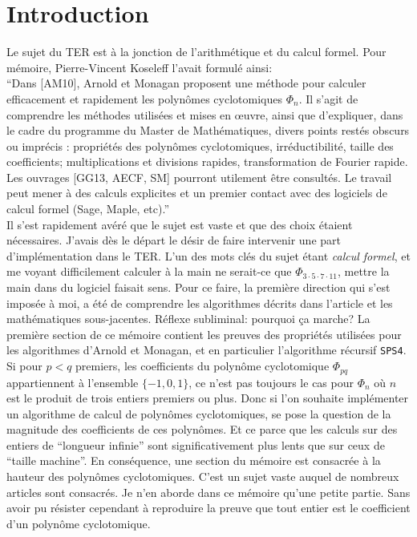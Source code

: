 \documentclass{article}
\newcounter{question}
\theoremstyle{break}                  %
\begin{document}
\section*{Introduction}
Le sujet du TER est à la jonction de l'arithmétique et du calcul formel. Pour mémoire, Pierre-Vincent Koseleff l'avait formulé ainsi:\\

\enquote{Dans [AM10], Arnold et Monagan proposent une méthode pour calculer efficacement et rapidement les polynômes cyclotomiques $\Phi_n$.
	Il s’agit de comprendre les méthodes utilisées et mises en œuvre, ainsi que d’expliquer, dans le cadre du programme du Master de Mathématiques, divers points restés obscurs ou imprécis : propriétés des polynômes cyclotomiques, irréductibilité, taille des coefficients; multiplications et divisions rapides, transformation de Fourier rapide.
	Les ouvrages [GG13, AECF, SM] pourront utilement être consultés. Le travail peut mener à des calculs explicites et un premier contact avec des logiciels de calcul formel (Sage, Maple, etc).}\\

Il s'est rapidement avéré que le sujet est vaste et que des choix étaient nécessaires. J'avais dès le départ le désir de faire intervenir une part d'implémentation dans le TER. L'un des mots clés du sujet étant \emph{calcul formel}, et me voyant difficilement calculer à la main ne serait-ce que $\Phi_{3 \cdot 5 \cdot 7 \cdot 11}$, mettre la main dans du logiciel faisait sens. Pour ce faire, la première direction qui s'est imposée à moi, a été de comprendre les algorithmes décrits dans l'article et les mathématiques sous-jacentes. Réflexe subliminal: pourquoi ça marche?  La première section de ce mémoire contient les preuves des propriétés utilisées pour les algorithmes d'Arnold et Monagan, et en particulier l'algorithme récursif \texttt{SPS4}.\\

Si pour $p < q$ premiers, les coefficients du polynôme cyclotomique $\Phi_{pq}$ appartiennent à l'ensemble $\{-1, 0, 1\}$, ce n'est pas toujours le cas pour $\Phi_n$ où $n$ est le produit de trois entiers premiers ou plus. Donc si l'on souhaite implémenter un algorithme de calcul de polynômes cyclotomiques, se pose la question de la magnitude des coefficients de ces polynômes. Et ce parce que les calculs sur des entiers de \enquote{longueur infinie} sont significativement plus lents que sur ceux de \enquote{taille machine}. En conséquence, une section du mémoire est consacrée à la hauteur des polynômes cyclotomiques. C'est un sujet vaste auquel de nombreux articles sont consacrés. Je n'en aborde dans ce mémoire qu'une petite partie. Sans avoir pu résister cependant à reproduire la preuve que tout entier est le coefficient d'un polynôme cyclotomique.\\
\end{document}
